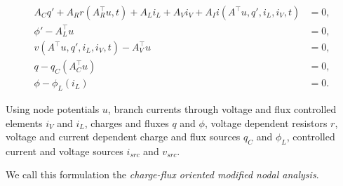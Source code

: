 \begin{align}
	A_C q' + A_R r(A_R^\top u,t) + A_L i_L + A_V i_V + A_I i(A^\top u, q', i_L, i_V, t) &= 0, \label{charge/flux-1} \\
	\phi' - A_L^\top u &= 0, \label{charge/flux-2} \\
	v(A^\top u, q', i_L, i_V, t) - A_V^\top u &= 0, \label{charge/flux-3} \\
	q - q_C(A_C^\top u) &= 0, \label{charge/flux-4} \\
	\phi - \phi_L(i_L) &= 0.  \label{charge/flux-5} 
\end{align}

Using node potentials $u$, branch currents through voltage and flux controlled elements $i_V$ and $i_L$, charges and fluxes $q$ and $\phi$, voltage dependent resistors $r$, voltage and current dependent charge and flux sources $q_C$ and $\phi_L$, controlled current and voltage sources $i_{src}$ and $v_{src}$.

We call this formulation the \emph{charge-flux oriented modified nodal analysis}.

